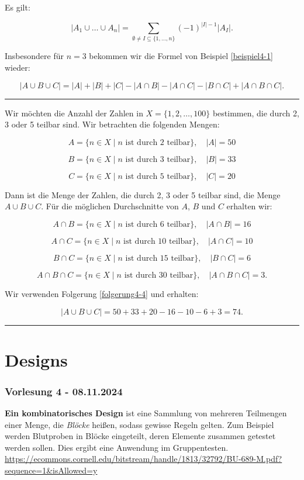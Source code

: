 \documentclass[9pt]{article}
\begin{document}
\begin{folg} \label{folgerung4-4}
 Es gilt:

\[
|A_1 \cup \dots \cup A_n| = \sum_{\emptyset \neq I \subseteq \{1, \dots, n\}} (-1)^{|I|-1} |A_I|.
\]

Insbesondere für \( n = 3 \) bekommen wir die Formel von Beispiel \ref{beispiel4-1} wieder:

\[
|A \cup B \cup C| = |A| + |B| + |C| - |A \cap B| - |A \cap C| - |B \cap C| + |A \cap B \cap C|.
\]
\end{folg} \noindent \rule{8cm}{0.4pt}

\begin{bsp}
Wir möchten die Anzahl der Zahlen in \( X = \{1, 2, \dots, 100\} \)
bestimmen, die durch 2, 3 oder 5 teilbar sind. Wir betrachten die folgenden
Mengen:

\[
A = \{n \in X \mid n \text{ ist durch 2 teilbar}\}, \quad |A| = 50
\]

\[
B = \{n \in X \mid n \text{ ist durch 3 teilbar}\}, \quad |B| = 33
\]

\[
C = \{n \in X \mid n \text{ ist durch 5 teilbar}\}, \quad |C| = 20
\]

Dann ist die Menge der Zahlen, die durch 2, 3 oder 5 teilbar sind, die Menge \( A \cup B \cup C \). Für die möglichen Durchschnitte von \( A \), \( B \) und \( C \) erhalten wir:

\[
A \cap B = \{n \in X \mid n \text{ ist durch 6 teilbar}\}, \quad |A \cap B| = 16
\]

\[
A \cap C = \{n \in X \mid n \text{ ist durch 10 teilbar}\}, \quad |A \cap C| = 10
\]

\[
B \cap C = \{n \in X \mid n \text{ ist durch 15 teilbar}\}, \quad |B \cap C| = 6
\]

\[
A \cap B \cap C = \{n \in X \mid n \text{ ist durch 30 teilbar}\}, \quad |A \cap B \cap C| = 3.
\] 

Wir verwenden Folgerung \ref{folgerung4-4} und erhalten:

\[
|A \cup B \cup C| = 50 + 33 + 20 - 16 - 10 - 6 + 3 = 74.
\]
\end{bsp} \noindent \rule{8cm}{0.4pt}


\section{Designs}
\subsubsection*{Vorlesung 4 - 08.11.2024}
\textbf{Ein kombinatorisches Design} ist eine Sammlung von mehreren Teilmengen einer Menge, die \textit{Blöcke} heißen, sodass gewisse Regeln gelten. Zum Beispiel werden Blutproben in Blöcke eingeteilt, deren Elemente zusammen getestet werden sollen. Dies ergibt eine Anwendung im Gruppentesten.  
\url{https://ecommons.cornell.edu/bitstream/handle/1813/32792/BU-689-M.pdf?sequence=1&isAllowed=y}
\end{document}
